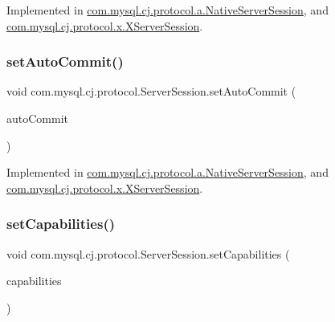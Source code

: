 Implemented in \mbox{\hyperlink{classcom_1_1mysql_1_1cj_1_1protocol_1_1a_1_1_native_server_session_a1c74717444fce778adbd567143aa950a}{com.\+mysql.\+cj.\+protocol.\+a.\+Native\+Server\+Session}}, and \mbox{\hyperlink{classcom_1_1mysql_1_1cj_1_1protocol_1_1x_1_1_x_server_session_a2789d075820b159e3b1fa98beb82bbfa}{com.\+mysql.\+cj.\+protocol.\+x.\+X\+Server\+Session}}.

\mbox{\label{interfacecom_1_1mysql_1_1cj_1_1protocol_1_1_server_session_a17b272e332ab95b8d67e8df8d3588908}} 
\subsubsection{\texorpdfstring{set\+Auto\+Commit()}{setAutoCommit()}}
{\footnotesize\ttfamily void com.\+mysql.\+cj.\+protocol.\+Server\+Session.\+set\+Auto\+Commit (\begin{DoxyParamCaption}\item[{boolean}]{auto\+Commit }\end{DoxyParamCaption})}



Implemented in \mbox{\hyperlink{classcom_1_1mysql_1_1cj_1_1protocol_1_1a_1_1_native_server_session_ae5619ea0802405494970f91db5b1cc46}{com.\+mysql.\+cj.\+protocol.\+a.\+Native\+Server\+Session}}, and \mbox{\hyperlink{classcom_1_1mysql_1_1cj_1_1protocol_1_1x_1_1_x_server_session_ae79fb491068b57b253b08f214ad06a1c}{com.\+mysql.\+cj.\+protocol.\+x.\+X\+Server\+Session}}.

\mbox{\label{interfacecom_1_1mysql_1_1cj_1_1protocol_1_1_server_session_a061f04bcb0fbf1c553fd52639c62b1cc}} 
\subsubsection{\texorpdfstring{set\+Capabilities()}{setCapabilities()}}
{\footnotesize\ttfamily void com.\+mysql.\+cj.\+protocol.\+Server\+Session.\+set\+Capabilities (\begin{DoxyParamCaption}\item[{\mbox{\hyperlink{interfacecom_1_1mysql_1_1cj_1_1protocol_1_1_server_capabilities}{Server\+Capabilities}}}]{capabilities }\end{DoxyParamCaption})}



